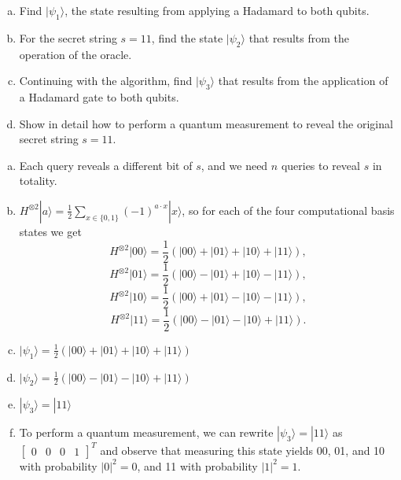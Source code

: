 \documentclass[11pt]{article}
\newenvironment{solution}{\begin{mdframed}[skipabove=\baselineskip,innertopmargin=\baselineskip,innerbottommargin=\baselineskip]
  }{\end{mdframed}}
\begin{document}
\begin{enumerate}[(a)]
    \item Find $|\psi_1\rangle$, the state resulting from applying a Hadamard to both qubits.
    \item For the secret string $s = 11$, find the state $|\psi_2\rangle$ that results from the operation of the oracle.
    \item Continuing with the algorithm, find $|\psi_3\rangle$ that results from the application of a Hadamard gate to both qubits.
    \item Show in detail how to perform a quantum measurement to reveal the original secret string $s = 11$.
\end{enumerate}

\begin{solution}
\begin{enumerate}[(a)]
    \item Each query reveals a different bit of $s$, and we need $n$ queries to reveal $s$ in totality.
    \item $H^{\otimes 2}|a\rangle = \frac{1}{2}\sum_{x\in \{0,1\}}(-1)^{a\cdot x}|x\rangle $, so for each of the four computational basis states we get 
          $$ H^{\otimes 2}|00\rangle = \frac{1}{2}(|00\rangle+|01\rangle+|10\rangle+|11\rangle),$$
          $$ H^{\otimes 2}|01\rangle = \frac{1}{2}(|00\rangle-|01\rangle+|10\rangle-|11\rangle),$$
          $$ H^{\otimes 2}|10\rangle = \frac{1}{2}(|00\rangle+|01\rangle-|10\rangle-|11\rangle),$$
          $$ H^{\otimes 2}|11\rangle = \frac{1}{2}(|00\rangle-|01\rangle-|10\rangle+|11\rangle).$$
    \item $|\psi_1\rangle = \frac{1}{2}(|00\rangle+|01\rangle+|10\rangle+|11\rangle)$
    \item $|\psi_2\rangle = \frac{1}{2}(|00\rangle-|01\rangle-|10\rangle+|11\rangle)$
    \item $|\psi_3\rangle = |11\rangle$
    \item To perform a quantum measurement, we can rewrite $|\psi_3\rangle = |11\rangle$ as $\begin{bmatrix}0&0&0&1\end{bmatrix}^T$ and observe that measuring this state yields 00, 01, and 10 with probability $|0|^2 = 0$, and 11 with probability $|1|^2 = 1$.
\end{enumerate}
\end{solution}
\end{document}
